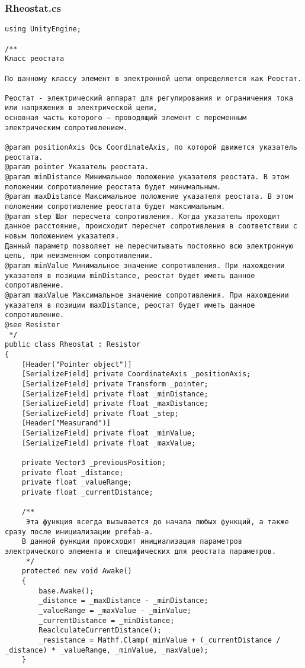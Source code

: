 \subsubsection*{Rheostat.cs}
\begin{verbatim}
﻿using UnityEngine;

/**
Класс реостата

По данному классу элемент в электронной цепи определяется как Реостат.

Реостат - электрический аппарат для регулирования и ограничения тока или напряжения в электрической цепи, 
основная часть которого — проводящий элемент с переменным электрическим сопротивлением.

@param positionAxis Ось CoordinateAxis, по которой движется указатель реостата.
@param pointer Указатель реостата.
@param minDistance Минимальное положение указателя реостата. В этом положении сопротивление реостата будет минимальным.
@param maxDistance Максимальное положение указателя реостата. В этом положении сопротивление реостата будет максимальным.
@param step Шаг пересчета сопротивления. Когда указатель проходит данное расстояние, происходит пересчет сопротивления в соответствии с новым положением указателя.
Данный параметр позволяет не пересчитывать постоянно всю электронную цепь, при неизменном сопротивлении.
@param minValue Минимальное значение сопротивления. При нахождении указателя в позиции minDistance, реостат будет иметь данное сопротивление.
@param maxValue Максимальное значение сопротивления. При нахождении указателя в позиции maxDistance, реостат будет иметь данное сопротивление.
@see Resistor
 */
public class Rheostat : Resistor
{
    [Header("Pointer object")]
    [SerializeField] private CoordinateAxis _positionAxis;
    [SerializeField] private Transform _pointer;
    [SerializeField] private float _minDistance;
    [SerializeField] private float _maxDistance;
    [SerializeField] private float _step;
    [Header("Measurand")]
    [SerializeField] private float _minValue;
    [SerializeField] private float _maxValue;

    private Vector3 _previousPosition;
    private float _distance;
    private float _valueRange;
    private float _currentDistance;

    /**
     Эта функция всегда вызывается до начала любых функций, а также сразу после инициализации prefab-а.
    В данной функции происходит инициализация параметров электрического элемента и специфических для реостата параметров.
     */
    protected new void Awake()
    {
        base.Awake();
        _distance = _maxDistance - _minDistance;
        _valueRange = _maxValue - _minValue;
        _currentDistance = _minDistance;
        ReaclculateCurrentDistance();
        _resistance = Mathf.Clamp(_minValue + (_currentDistance / _distance) * _valueRange, _minValue, _maxValue);
    }


\end{verbatim}
